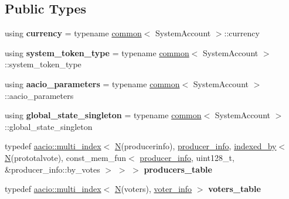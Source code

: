 \subsection*{Public Types}
\begin{DoxyCompactItemize}
\item 
\mbox{\label{classaaciosystem_1_1voting_ab90861646dedbaaa286b61f8cc4f60dc}} 
using {\bfseries currency} = typename \mbox{\hyperlink{classaaciosystem_1_1common}{common}}$<$ System\+Account $>$\+::currency
\item 
\mbox{\label{classaaciosystem_1_1voting_a11004e9a39370a60b4ba520d24d81762}} 
using {\bfseries system\+\_\+token\+\_\+type} = typename \mbox{\hyperlink{classaaciosystem_1_1common}{common}}$<$ System\+Account $>$\+::system\+\_\+token\+\_\+type
\item 
\mbox{\label{classaaciosystem_1_1voting_a3da069a90a5e835e3404ab2c661c6ded}} 
using {\bfseries aacio\+\_\+parameters} = typename \mbox{\hyperlink{classaaciosystem_1_1common}{common}}$<$ System\+Account $>$\+::aacio\+\_\+parameters
\item 
\mbox{\label{classaaciosystem_1_1voting_ad852bde7fbe64ee843251c7b5a856166}} 
using {\bfseries global\+\_\+state\+\_\+singleton} = typename \mbox{\hyperlink{classaaciosystem_1_1common}{common}}$<$ System\+Account $>$\+::global\+\_\+state\+\_\+singleton
\item 
\mbox{\label{classaaciosystem_1_1voting_a3f7085ee93c937b9a816cf5b1af283c2}} 
typedef \mbox{\hyperlink{classaacio_1_1multi__index}{aacio\+::multi\+\_\+index}}$<$ \mbox{\hyperlink{group__types_gaf9c1edb0e0da55ec6ba09f32f6839529}{N}}(producerinfo), \mbox{\hyperlink{structaaciosystem_1_1voting_1_1producer__info}{producer\+\_\+info}}, \mbox{\hyperlink{structaacio_1_1indexed__by}{indexed\+\_\+by}}$<$ \mbox{\hyperlink{group__types_gaf9c1edb0e0da55ec6ba09f32f6839529}{N}}(prototalvote), const\+\_\+mem\+\_\+fun$<$ \mbox{\hyperlink{structaaciosystem_1_1voting_1_1producer__info}{producer\+\_\+info}}, uint128\+\_\+t, \&producer\+\_\+info\+::by\+\_\+votes $>$ $>$ $>$ {\bfseries producers\+\_\+table}
\item 
\mbox{\label{classaaciosystem_1_1voting_ae7fcccedce2fbb33948d9a17f39b3c9d}} 
typedef \mbox{\hyperlink{classaacio_1_1multi__index}{aacio\+::multi\+\_\+index}}$<$ \mbox{\hyperlink{group__types_gaf9c1edb0e0da55ec6ba09f32f6839529}{N}}(voters), \mbox{\hyperlink{structaaciosystem_1_1voting_1_1voter__info}{voter\+\_\+info}} $>$ {\bfseries voters\+\_\+table}
\end{DoxyCompactItemize}
